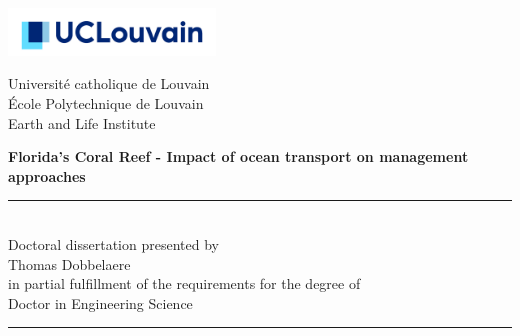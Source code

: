 \thispagestyle{empty}
\begin{minipage}[b]{0.3\textwidth}
\hspace*{-0.8cm}\includegraphics[width=5.5cm]{./figures/logo_ucl.jpg}\vspace{0.35cm}
\end{minipage}
\begin{minipage}[b]{0.69\textwidth}
	\begin{center}
	\hspace*{0.5cm}Université catholique de Louvain\\
	\hspace*{0.5cm}\'Ecole Polytechnique de Louvain\\
	\hspace*{0.5cm} Earth and Life Institute\\
	\end{center}
\end{minipage}


\vspace*{3cm}
\hspace{-0.8cm}
\begin{minipage}{1.02\linewidth}
\centering
\LARGE\bfseries Florida's Coral Reef - Impact of ocean transport on management approaches %
\end{minipage}


\vspace*{0.5cm}
\hspace{-0.5cm}\begin{minipage}{\textwidth}
\centering
\rule{50pt}{.5pt}\\[1.2ex]
Doctoral dissertation presented by \\ [2.ex]
{\Large Thomas Dobbelaere\\ [2.ex]
}
in partial fulfillment of the requirements for the degree of\\ [2.ex]
\Large Doctor in Engineering Science

\rule{50pt}{.5pt}\\
\end{minipage}

